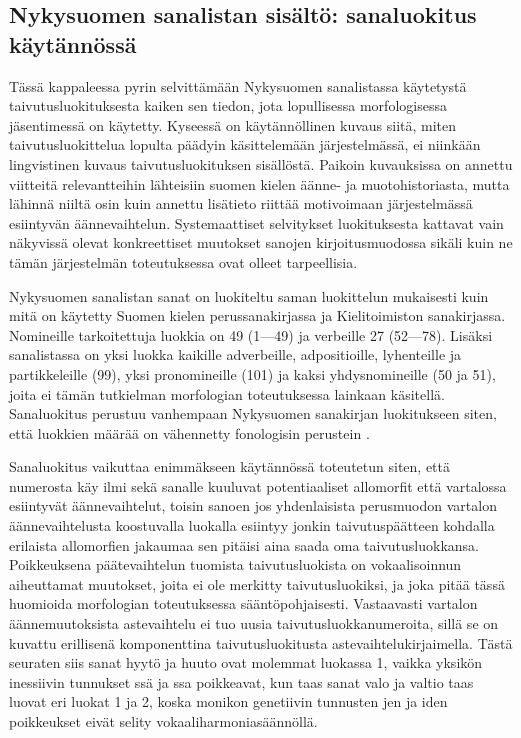 \documentclass[free]{flammie}
\begin{document}
\subsection{Nykysuomen sanalistan sisältö: sanaluokitus käytännössä}
\label{subsec:22}

Tässä kappaleessa pyrin selvittämään Nykysuomen sanalistassa käytetystä taivutusluokituksesta kaiken sen tiedon, jota lopullisessa morfologisessa jäsentimessä
on käytetty. Kyseessä on käytännöllinen kuvaus siitä, miten taivutusluokittelua
lopulta päädyin käsittelemään järjestelmässä, ei niinkään lingvistinen kuvaus taivutusluokituksen sisällöstä. Paikoin kuvauksissa on annettu viitteitä relevantteihin lähteisiin suomen kielen äänne- ja muotohistoriasta, mutta lähinnä niiltä osin
kuin annettu lisätieto riittää motivoimaan järjestelmässä esiintyvän äännevaihtelun. Systemaattiset selvitykset luokituksesta kattavat vain näkyvissä olevat konkreettiset muutokset sanojen kirjoitusmuodossa sikäli kuin ne tämän järjestelmän
toteutuksessa ovat olleet tarpeellisia.

Nykysuomen sanalistan sanat on luokiteltu saman luokittelun mukaisesti kuin mitä on käytetty Suomen kielen perussanakirjassa ja Kielitoimiston sanakirjassa.
Nomineille tarkoitettuja luokkia on 49 (1—49) ja verbeille 27 (52—78). Lisäksi sanalistassa on yksi luokka kaikille adverbeille, adpositioille, lyhenteille ja partikkeleille (99), yksi pronomineille (101) ja kaksi yhdysnomineille (50 ja 51), joita ei tämän tutkielman morfologian toteutuksessa lainkaan käsitellä. Sanaluokitus
perustuu vanhempaan Nykysuomen sanakirjan luokitukseen siten, että luokkien
määrää on vähennetty fonologisin perustein \cite{eronen1994suomen}.

Sanaluokitus vaikuttaa enimmäkseen käytännössä toteutetun siten, että numerosta käy ilmi sekä sanalle kuuluvat potentiaaliset allomorfit että vartalossa esiintyvät äännevaihtelut, toisin sanoen jos yhdenlaisista perusmuodon vartalon äännevaihtelusta koostuvalla luokalla esiintyy jonkin taivutuspäätteen kohdalla erilaista
allomorfien jakaumaa sen pitäisi aina saada oma taivutusluokkansa. Poikkeuksena päätevaihtelun tuomista taivutusluokista on vokaalisoinnun aiheuttamat muutokset, joita ei ole merkitty taivutusluokiksi, ja joka pitää tässä huomioida morfologian toteutuksessa sääntöpohjaisesti. Vastaavasti vartalon äännemuutoksista
astevaihtelu ei tuo uusia taivutusluokkanumeroita, sillä se on kuvattu erillisenä
komponenttina taivutusluokitusta astevaihtelukirjaimella. Tästä seuraten siis sanat hyytö ja huuto ovat molemmat luokassa 1, vaikka yksikön inessiivin tunnukset
ssä ja ssa poikkeavat, kun taas sanat valo ja valtio taas luovat eri luokat 1 ja 2,
koska monikon genetiivin tunnusten jen ja iden poikkeukset eivät selity vokaaliharmoniasäännöllä.
\end{document}
